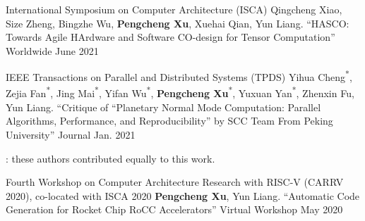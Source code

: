 
\clearpage



\begin{cventries}

  \cventry
    {International Symposium on Computer Architecture (ISCA)}
    {{\normalfont Qingcheng Xiao, Size Zheng, Bingzhe Wu, \textbf{Pengcheng Xu}, Xuehai Qian, Yun Liang. ``HASCO: Towards Agile HArdware and Software CO-design for Tensor Computation''}}
    {Worldwide} %
    {June 2021} %
    {}

  \cventry
    {IEEE Transactions on Parallel and Distributed Systems (TPDS)}
    {{\normalfont Yihua Cheng\textsuperscript{*}, Zejia Fan\textsuperscript{*}, Jing Mai\textsuperscript{*}, Yifan Wu\textsuperscript{*}, \textbf{Pengcheng Xu}\textsuperscript{*}, Yuxuan Yan\textsuperscript{*}, Zhenxin Fu, Yun Liang. ``Critique of “Planetary Normal Mode Computation: Parallel Algorithms, Performance, and Reproducibility” by SCC Team From Peking University''}}
    {Journal} %
    {Jan. 2021} %
    {
      \begin{cvitems} %
      \item {\footnotesize *: these authors contributed equally to this work.}
      \end{cvitems}
    }

  \cventry
    {Fourth Workshop on Computer Architecture Research with RISC-V (CARRV 2020), co-located with ISCA 2020} %
    {{\normalfont \textbf{Pengcheng Xu}, Yun Liang. ``Automatic Code Generation for Rocket Chip RoCC Accelerators''}} %
    {Virtual Workshop} %
    {May 2020} %
    {}
\end{cventries}
